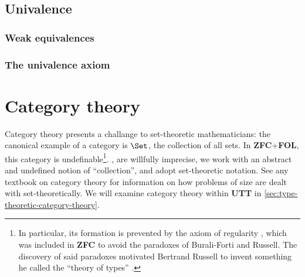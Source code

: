 \documentclass[12pt,twoside,draft]{reedthesis}
\makeatletter
\newcommand{\TODO}[1]{\marginpar{\footnotesize\color{TODO}todo: #1}}
\let\oldindex\index
\renewcommand{\index}[1]{\oldindex{#1}\marginpar{\footnotesize\color{index}index: #1}}
\newcommand{\indeX}[1]{\oldindex{#1}}
\newcommand{\abbreviation}[1]{\textbf{#1}\indeX{#1@\textbf{#1}}} %
\newtheorem{notation}[theorem]{Notation}
\makeatother
\begin{document}
\section{Univalence}
\label{sec:univalence}

\subsection{Weak equivalences}
\label{subsec:weak-equivalences}


\subsection{The univalence axiom}
\label{subsec:the-univalence-axiom}



\chapter{Category theory}
\label{chap:category-theory}

Category theory presents a challange to set-theoretic mathematicians: the
canonical example of a category is $\Set$, the collection of all sets. In
\abbreviation{ZFC}+\abbreviation{FOL}, this category is undefinable\footnote{In
  particular, its formation is prevented by the axiom of regularity
  \cite{vonneumann}, which was included in \abbreviation{ZFC} to avoid the
  paradoxes of Burali-Forti and Russell. The discovery of said paradoxes
  motivated Bertrand Russell to invent something he called the ``theory of
  types'' \cite{russell}.}.
, 
are willfully imprecise, we work with an abstract and undefined notion of
``collection'', and adopt set-theoretic notation. See any textbook on category
theory for information on how problems of size are dealt with set-theoretically.
We will examine category theory within \abbreviation{UTT} in
\cref{sec:type-theoretic-category-theory}.
\end{document}
